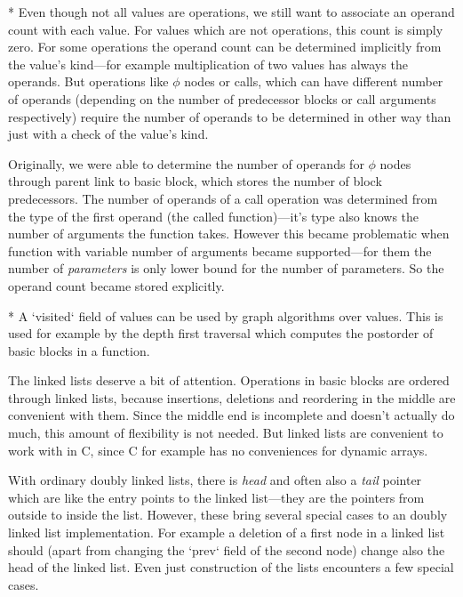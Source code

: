 * Even though not all values are operations, we still want to associate an
operand count with each value. For values which are not operations, this count
is simply zero. For some operations the operand count can be determined
implicitly from the value's kind---for example multiplication of two values has
always the operands. But operations like $\phi$ nodes or calls, which can have
different number of operands (depending on the number of predecessor blocks or
call arguments respectively) require the number of operands to be determined in
other way than just with a check of the value's kind.

Originally, we were able to determine the number of operands for $\phi$ nodes
through parent link to basic block, which stores the number of block
predecessors. The number of operands of a call operation was determined from the
type of the first operand (the called function)---it's type also knows the
number of arguments the function takes. However this became problematic when
function with variable number of arguments became supported---for them the
number of {\em parameters} is only lower bound for the number of parameters. So
the operand count became stored explicitly.

* A `visited` field of values can be used by graph algorithms over values. This
is used for example by the depth first traversal which computes the postorder
of basic blocks in a function.
\enditems

The linked lists deserve a bit of attention. Operations in basic blocks are
ordered through linked lists, because insertions, deletions and reordering in
the middle are convenient with them. Since the middle end is incomplete and
doesn't actually do much, this amount of flexibility is not needed. But linked
lists are convenient to work with in C, since C for example has no conveniences
for dynamic arrays.

With ordinary doubly linked lists, there is {\em head} and often also a {\em
tail} pointer which are like the entry points to the linked list---they are the
pointers from outside to inside the list. However, these bring several special
cases to an doubly linked list implementation. For example a deletion of a first
node in a linked list should (apart from changing the `prev` field of the second
node) change also the head of the linked list. Even just construction of the lists
encounters a few special cases.

